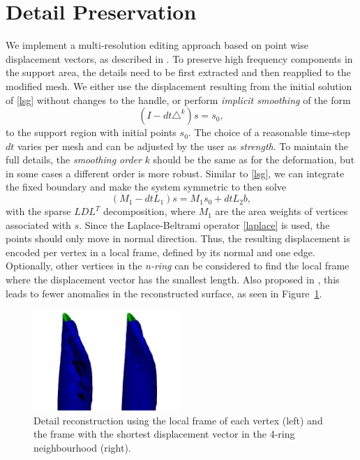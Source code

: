 \documentclass[twocolumn]{article}
\begin{document}
\section{Detail Preservation}
We implement a multi-resolution editing approach based on point wise displacement vectors, as described in \cite{kobbelt1998interactive}.
To preserve high frequency components in the support area, the details need to be first extracted and then reapplied to the modified mesh. We either use the displacement resulting from the initial solution of \eqref{lsg} without changes to the handle, or perform \textit{implicit smoothing} of the form
\begin{equation}
(I - dt \triangle^k) s = s_0,
\end{equation}
to the support region with initial points $s_0$. The choice of a reasonable time-step $dt$ varies per mesh and can be adjusted by the user as \textit{strength}.
To maintain the full details, the \textit{smoothing order} $k$ should be the same as for the deformation, but in some cases a different order is more robust.
Similar to \eqref{lsg}, we can integrate the fixed boundary and make the system symmetric to then solve
\begin{equation}
(M_1 - dt L_1) s = M_1 s_0 + dt L_2 b,
\end{equation}
with the sparse $LDL^T$ decomposition, where $M_1$ are the area weights of vertices associated with $s$.
Since the Laplace-Beltrami operator \eqref{laplace} is used, the points should only move in normal direction.
Thus, the resulting displacement is encoded per vertex in a local frame, defined by its normal and one edge. Optionally, other vertices in the \textit{n-ring} can be considered to find the local frame where the displacement vector has the smallest length. Also proposed in \cite{kobbelt1998interactive}, this leads to fewer anomalies in the reconstructed surface, as seen in Figure~\ref{fig:searchRing}.
\begin{figure}
	\includegraphics[width=0.5\textwidth]{searchframe.png}
	\caption{Detail reconstruction using the local frame of each vertex (left) and the frame with the shortest displacement vector in the 4-ring neighbourhood (right). }
	\label{fig:searchRing}
\end{figure}
\end{document}
